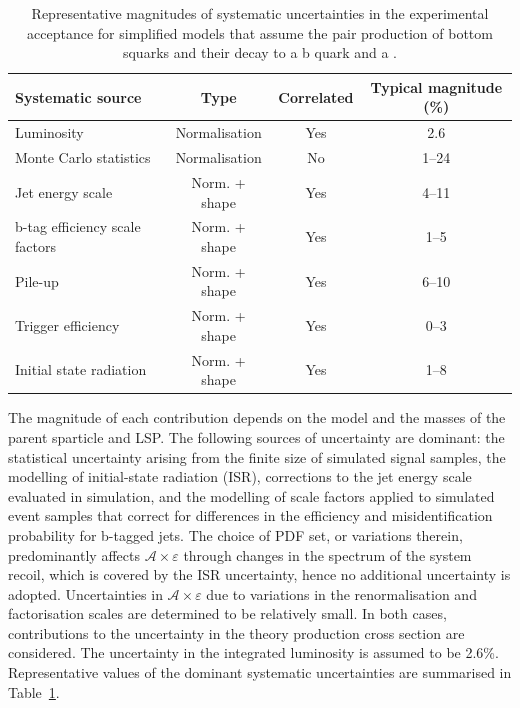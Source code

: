 \begin{table}[h!]
  \caption{
    Representative magnitudes of systematic uncertainties in the
    experimental acceptance for simplified models that assume the 
    pair production of bottom squarks and their decay to a b
    quark and a \chiz.}  
  \label{tab:signal_systs}
  \centering
  \footnotesize
  \begin{tabular}{ lccc }
    \hline
    Systematic source\T\B          & Type          & Correlated & Typical magnitude (\%) \\
    \hline
    Luminosity\T                   & Normalisation & Yes        & 2.6                    \\
    Monte Carlo statistics         & Normalisation & No         & 1--24                  \\
    Jet energy scale               & Norm. + shape & Yes        & 4--11                  \\
    b-tag efficiency scale factors & Norm. + shape & Yes        & 1--5                   \\
    Pile-up                        & Norm. + shape & Yes        & 6--10                  \\
    Trigger efficiency             & Norm. + shape & Yes        & 0--3                   \\
    Initial state radiation        & Norm. + shape & Yes        & 1--8                   \\
    \hline
  \end{tabular}
\end{table}

The magnitude of each contribution depends on the model and the masses
of the parent sparticle and LSP. The following sources of uncertainty
are dominant: the statistical uncertainty arising from the finite size
of simulated signal samples, the modelling of initial-state radiation
(ISR), corrections to the jet energy scale evaluated in simulation,
and the modelling of scale factors applied to simulated event samples
that correct for differences in the efficiency and misidentification
probability for b-tagged jets. The choice of PDF set, or variations
therein, predominantly affects $\mathcal{A}\times\varepsilon$ through
changes in the \pt spectrum of the system recoil, which is covered by
the ISR uncertainty, hence no additional uncertainty is
adopted. Uncertainties in $\mathcal{A}\times\varepsilon$ due to
variations in the renormalisation and factorisation scales are
determined to be relatively small. In both cases, contributions to the
uncertainty in the theory production cross section are considered. The
uncertainty in the integrated luminosity is assumed to be
2.6\%. Representative values of the dominant systematic uncertainties
are summarised in Table~\ref{tab:signal_systs}.

